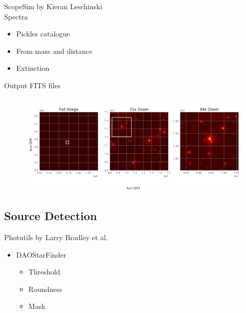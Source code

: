 \documentclass{beamer}
\begin{document}
\begin{frame}

ScopeSim by Kieran Leschinski
\\[2ex]
Spectra
\begin{itemize}
\item Pickles catalogue
\item From mass and distance
\item Extinction
\end{itemize}
\vspace{\baselineskip}
Output FITS files
\end{frame}

\begin{frame}
\begin{figure}
\centering
\includegraphics[width=\textwidth]{Images/fits_snapshot.png}
\end{figure}
\end{frame}

\subsection{Source Detection}

\begin{frame}
Photutils by Larry Bradley et al.
\\[2ex]
\begin{itemize}
\item DAOStarFinder
	\begin{itemize}
	\item Threshold
	\item Roundness
	\item Mask
	\end{itemize}

\end{itemize}
\end{frame}
\end{document}
